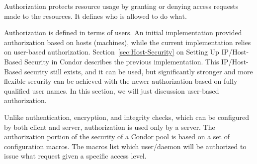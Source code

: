 Authorization protects resource usage by granting or denying
access requests made to the resources.
It defines who is allowed to do what.

Authorization is defined in terms of users.
An initial implementation provided authorization
based on hosts (machines), while the current implementation
relies on user-based authorization.
Section~\ref{sec:Host-Security}
on Setting Up IP/Host-Based Security in Condor describes the
previous implementation.
This IP/Host-Based security still exists, and it can be used,
but significantly stronger and more flexible
security can be achieved with the newer
authorization based on fully qualified user names.
In this section, we will just discussion user-based authorization. 


Unlike authentication, encryption, and integrity checks,
which can be configured by both client and server,
authorization is used only by a server.
The authorization portion of the security of a Condor pool is
based on a set of configuration macros.
The macros list which user/daemon will be authorized
to issue what request given a specific access level.

